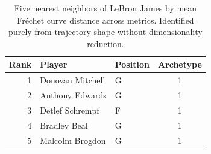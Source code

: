 \begin{table}[htbp]
  \centering\small
  \begin{tabular}{rllc}
    \toprule
    Rank & Player & Position & Archetype \\
    \midrule
    1 & Donovan Mitchell & G & 1 \\
    2 & Anthony Edwards & G & 1 \\
    3 & Detlef Schrempf & F & 1 \\
    4 & Bradley Beal & G & 1 \\
    5 & Malcolm Brogdon & G & 1 \\
    \bottomrule
  \end{tabular}
  \caption{Five nearest neighbors of LeBron James by mean Fr\'{e}chet curve distance across metrics. Identified purely from trajectory shape without dimensionality reduction.}
  \label{tab:LeBron_James_frechet_curve_neighbors}
\end{table}

